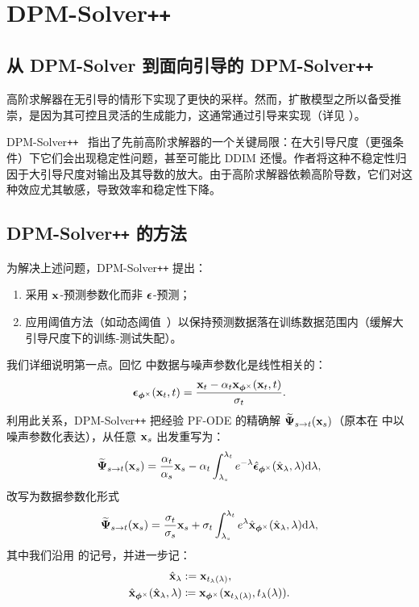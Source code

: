 \section{\texorpdfstring{DPM-Solver\texttt{++}}{DPM-Solver\texttt{++}}}\label{sec:dpm++}


\subsection{从 DPM-Solver 到面向引导的 DPM-Solver\texttt{++}}
高阶求解器在无引导的情形下实现了更快的采样。然而，扩散模型之所以备受推崇，是因为其可控且灵活的生成能力，这通常通过引导来实现（详见 ）。

DPM-Solver\texttt{++}~\citep{lu2022dpm2} 指出了先前高阶求解器的一个关键局限：在大引导尺度（更强条件）下它们会出现稳定性问题，甚至可能比 DDIM 还慢。作者将这种不稳定性归因于大引导尺度对输出及其导数的放大。由于高阶求解器依赖高阶导数，它们对这种效应尤其敏感，导致效率和稳定性下降。


\subsection{DPM-Solver\texttt{++} 的方法}
为解决上述问题，DPM-Solver\texttt{++} 提出：
\begin{enumerate}
    \item 采用 ${\mathbf{x}}$-预测参数化而非 ${\bm{\epsilon}}$-预测；
    \item 应用阈值方法（如动态阈值~\citep{saharia2022photorealistic}）以保持预测数据落在训练数据范围内（缓解大引导尺度下的训练-测试失配）。
\end{enumerate}

我们详细说明第一点。回忆  中数据与噪声参数化是线性相关的：
\[
\bm{\epsilon}_{\bm{\phi}^\times}({\mathbf{x}}_t, t) = \frac{{\mathbf{x}}_t - \alpha_t {\mathbf{x}}_{\bm{\phi}^\times}({\mathbf{x}}_t, t)}{\sigma_t}.
\]
利用此关系，DPM-Solver\texttt{++} 把经验 PF-ODE 的精确解 $\widetilde{{\bm{\Psi}}}_{s\to t}({\mathbf{x}}_s)$（原本在  中以噪声参数化表达），从任意 ${\mathbf{x}}_s$ 出发重写为：
\[
    \widetilde{{\bm{\Psi}}}_{s\to t}({\mathbf{x}}_s)
    = \frac{\alpha_t}{\alpha_s}{\mathbf{x}}_s
      - \alpha_t \int_{\lambda_s}^{\lambda_t}
        e^{-\lambda}  \hat{\bm{\epsilon}}_{\bm{\phi}^\times}(\hat{{\mathbf{x}}}_\lambda, \lambda)  \mathrm{d}\lambda,
\]
改写为数据参数化形式
\[
    \widetilde{{\bm{\Psi}}}_{s\to t}({\mathbf{x}}_s)
    = \frac{\sigma_t}{\sigma_s}{\mathbf{x}}_s
      + \sigma_t \int_{\lambda_s}^{\lambda_t}
        e^{\lambda}  \hat{{\mathbf{x}}}_{\bm{\phi}^\times}(\hat{{\mathbf{x}}}_\lambda, \lambda)  \mathrm{d}\lambda,
\]
其中我们沿用  的记号，并进一步记：
\begin{align*}
\begin{aligned}
 \hat{{\mathbf{x}}}_{\lambda} & := {\mathbf{x}}_{t_\lambda(\lambda)}, \\
 \hat{{\mathbf{x}}}_{\bm{\phi}^\times}(\hat{{\mathbf{x}}}_{\lambda}, \lambda) & \coloneqq {\mathbf{x}}_{\bm{\phi}^\times}({\mathbf{x}}_{t_\lambda(\lambda)}, t_\lambda(\lambda)).
\end{aligned}
\end{align*}

